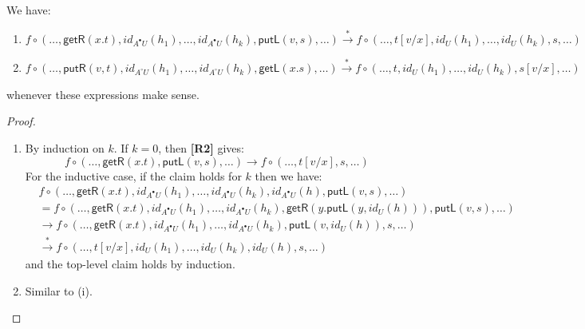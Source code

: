 \documentclass[twoside,11pt,final]{entics}
\newcommand{\seq}{,\!\ldots\!,}
\begin{document}
\begin{lemma}\label{lem:interact-across-id}
  We have:
  \begin{enumerate} 
  \item 
    $f \circ (\dots\! , \textsf{getR}(x.t) , id_{A^\bullet U}(h_1) \seq id_{A^\bullet U}(h_k) , \textsf{putL}(v,s) ,\! \dots)
    \stackrel{*}{\to} 
    f \circ (\dots\! , t[v/x] , id_{U}(h_1) \seq  id_{U}(h_k) , s , \! \dots)$
  \item 
    $f \circ (\dots \! , \textsf{putR}(v,t) , id_{A^\circ U}(h_1) \seq id_{A^\circ U}(h_k) , \textsf{getL}(x.s) ,\! \dots)
    \stackrel{*}{\to} 
    f \circ (\dots \! , t , id_{U}(h_1) \seq id_{U}(h_k) , s[v/x] ,\! \dots)$
  \end{enumerate}
  whenever these expressions make sense.
\end{lemma}
\begin{proof}
  \begin{enumerate}
  \item By induction on $k$. If $k = 0$, then \textbf{[R2]} gives:
    \[
      f \circ (\dots \! , \textsf{getR}(x.t) , \textsf{putL}(v,s) , \! \dots)
      \to f \circ (\dots \! , t[v/x] , s ,\! \dots)
    \]
    For the inductive case, if the claim holds for $k$ then we have:
    \begin{align*}
      & f \circ (\dots \!, \textsf{getR}(x.t) , id_{A^\bullet U}(h_1) \seq  id_{A^\bullet U}(h_k) , id_{A^\bullet U}(h) , \textsf{putL}(v,s) , \! \dots)
      \\& = f \circ (\dots \! , \textsf{getR}(x.t) , id_{A^\bullet U}(h_1) \seq  id_{A^\bullet U}(h_k) , \textsf{getR}(y.\textsf{putL}(y,id_{U}(h))) , \textsf{putL}(v,s) , \! \dots)
      \\& \to f \circ (\dots \! , \textsf{getR}(x.t) , id_{A^\bullet U}(h_1) \seq  id_{A^\bullet U}(h_k) , \textsf{putL}(v,id_{U}(h)) , s , \! \dots)
      \\& \stackrel{*}{\to} f \circ (\dots \! , t[v/x] , id_{U}(h_1) \seq  id_{U}(h_k), id_U(h) , s , \! \dots)
    \end{align*}
    and the top-level claim holds by induction.
  \item Similar to (i).
  \end{enumerate}
\end{proof}
\end{document}
